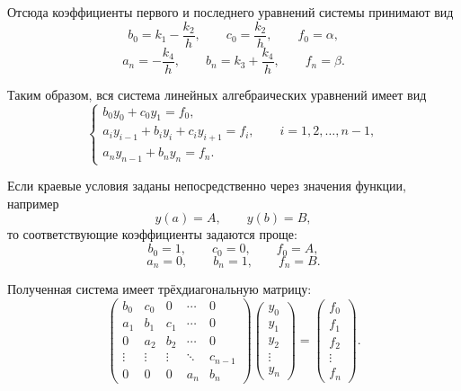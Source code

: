 \documentclass[12pt,a4paper]{article}
\begin{document}
Отсюда коэффициенты первого и последнего уравнений системы принимают вид
\begin{equation*}
    b_0 = k_1 - \frac{k_2}{h},
    \qquad
    c_0 = \frac{k_2}{h},
    \qquad
    f_0 = \alpha,
\end{equation*}
\begin{equation*}
    a_n = -\frac{k_4}{h},
    \qquad
    b_n = k_3 + \frac{k_4}{h},
    \qquad
    f_n = \beta.
\end{equation*}

Таким образом, вся система линейных алгебраических уравнений имеет вид
\begin{equation*}
\begin{cases}
    b_0 y_0 + c_0 y_1 = f_0, \\[4pt]
    a_i y_{i-1} + b_i y_i + c_i y_{i+1} = f_i,
    \qquad i = 1,2,\ldots,n-1, \\[4pt]
    a_n y_{n-1} + b_n y_n = f_n.
\end{cases}
\end{equation*}

Если краевые условия заданы непосредственно через значения функции, например
\begin{equation*}
    y(a) = A, \qquad y(b) = B,
\end{equation*}
то соответствующие коэффициенты задаются проще:
\begin{equation*}
    b_0 = 1, \qquad c_0 = 0, \qquad f_0 = A,
\end{equation*}
\begin{equation*}
    a_n = 0, \qquad b_n = 1, \qquad f_n = B.
\end{equation*}

Полученная система имеет трёхдиагональную матрицу:
\begin{equation*}
\begin{pmatrix}
b_0 & c_0 & 0 & \cdots & 0 \\
a_1 & b_1 & c_1 & \cdots & 0 \\
0 & a_2 & b_2 & \cdots & 0 \\
\vdots & \vdots & \vdots & \ddots & c_{n-1} \\
0 & 0 & 0 & a_n & b_n
\end{pmatrix}
\begin{pmatrix}
y_0 \\ y_1 \\ y_2 \\ \vdots \\ y_n
\end{pmatrix}
=
\begin{pmatrix}
f_0 \\ f_1 \\ f_2 \\ \vdots \\ f_n
\end{pmatrix}.
\end{equation*}
\end{document}

